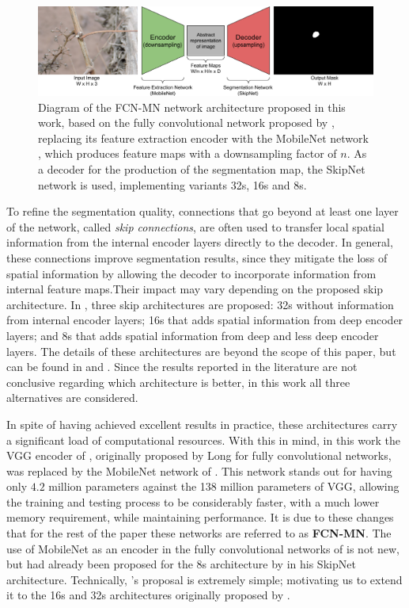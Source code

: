 \documentclass[a4paper,authoryear,review]{elsarticle}
\begin{document}
	
	
	\begin{figure}
		\centering
		\includegraphics[width=12cm]{figures/Figure1.png}
		\caption{
			Diagram of the FCN-MN network architecture proposed in this work, based on the fully convolutional network proposed by \citet{shelhamer2017fully}, replacing its feature extraction encoder with the MobileNet network \citet{howard2017mobilenets}, which produces feature maps with a downsampling factor of $n$. As a decoder for the production of the segmentation map, the SkipNet network \citet{siam2018rtseg} is used, implementing variants 32s, 16s and 8s.
		}
		\label{fig:Figure1}
	\end{figure}
	
	To refine the segmentation quality, connections that go beyond at least one layer of the network, called \emph{skip connections}, are often used to transfer local spatial information from the internal encoder layers directly to the decoder. In general, these connections improve segmentation results, since they mitigate the loss of spatial information by allowing the decoder to incorporate information from internal feature maps.Their impact may vary depending on the proposed skip architecture. In \citet{long2015fully}, three skip architectures are proposed: 32s without information from internal encoder layers; 16s that adds spatial information from deep encoder layers; and 8s that adds spatial information from deep and less deep encoder layers. The details of these architectures are beyond the scope of this paper, but can be found in \citet{long2015fully} and \citet{shelhamer2017fully}. Since the results reported in the literature are not conclusive regarding which architecture is better, in this work all three alternatives are considered.
	
	In spite of having achieved excellent results in practice, these architectures carry a significant load of computational resources. With this in mind, in this work the VGG encoder of \citet{Simonyan2015VeryDC}, originally proposed by Long for fully convolutional networks, was replaced by the MobileNet network of \citet{howard2017mobilenets}. This network stands out for having only $4.2$ million parameters against the 138 million parameters of VGG, allowing the training and testing process to be considerably faster, with a much lower memory requirement, while maintaining performance. It is due to these changes that for the rest of the paper these networks are referred to as \textbf{FCN-MN}. The use of MobileNet as an encoder in the fully convolutional networks of \citet{long2015fully} is not new, but had already been proposed for the 8s architecture by \citet{siam2018rtseg} in his SkipNet architecture. Technically, \citet{siam2018rtseg}’s proposal is extremely simple; motivating us to extend it to the 16s and 32s architectures originally proposed by \citep{long2015fully}. 
	
\end{document}
